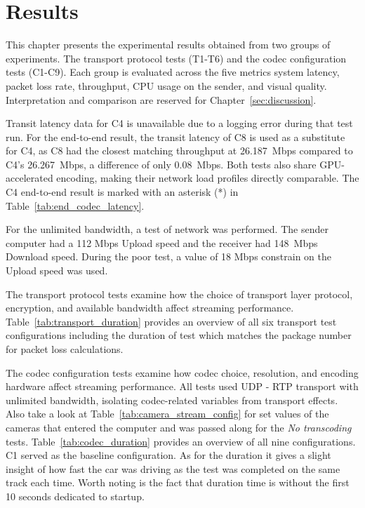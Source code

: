 \section{Results}\label{sec:results}

This chapter presents the experimental results obtained from two groups of experiments. The transport protocol tests (T1-T6) and the codec configuration tests (C1-C9). Each group is evaluated across the five metrics system latency, packet loss rate, throughput, CPU usage on the sender, and visual quality. Interpretation and comparison are reserved for Chapter~\ref{sec:discussion}.

Transit latency data for C4 is unavailable due to a logging error during that test run. For the end-to-end result, the transit latency of C8 is used as a substitute for C4, as C8 had the closest matching throughput at 26.187~Mbps compared to C4's 26.267~Mbps, a difference of only 0.08~Mbps. Both tests also share GPU-accelerated encoding, making their network load profiles directly comparable. The C4 end-to-end result is marked with an asterisk (*) in Table~\ref{tab:end_codec_latency}.

For the unlimited bandwidth, a test of network was performed. The sender computer had a 112 Mbps Upload speed and the receiver had 148~Mbps Download speed. During the poor test, a value of 18 Mbps constrain on the Upload speed was used.

The transport protocol tests examine how the choice of transport layer protocol, encryption, and available bandwidth affect streaming performance. Table~\ref{tab:transport_duration} provides an overview of all six transport test configurations including the duration of test which matches the package number for packet loss calculations. 



The codec configuration tests examine how codec choice, resolution, and encoding hardware affect streaming performance. All tests used UDP - RTP transport with unlimited bandwidth, isolating codec-related variables from transport effects. Also take a look at Table~\ref{tab:camera_stream_config} for set values of the cameras that entered the computer and was passed along for the \textit{No transcoding} tests. Table~\ref{tab:codec_duration} provides an overview of all nine configurations. C1 served as the baseline configuration. As for the duration it gives a slight insight of how fast the car was driving as the test was completed on the same track each time. Worth noting is the fact that duration time is without the first 10 seconds dedicated to startup.

